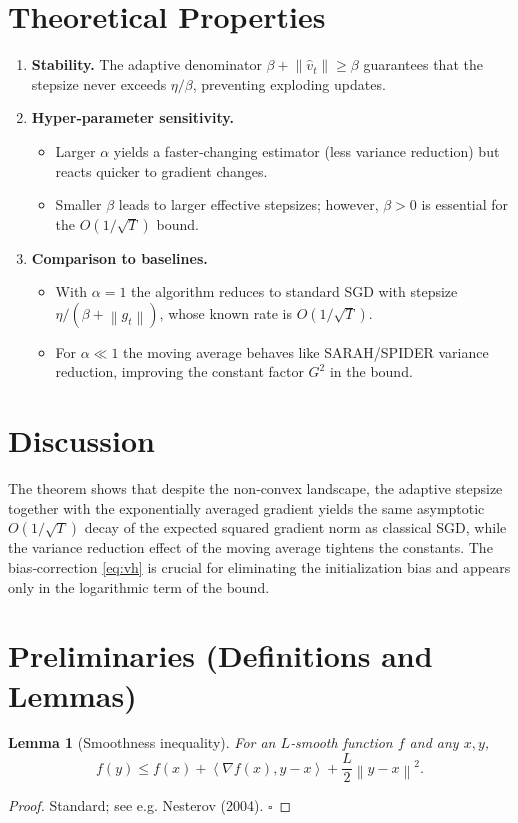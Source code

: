 \documentclass{article}
\newtheorem{lemma}{Lemma}
\newcommand{\norm}[1]{\left\|#1\right\|}
\newcommand{\ip}[2]{\left\langle #1,#2 \right\rangle}
\newcommand{\grad}{\nabla}
\begin{document}
\section*{Theoretical Properties}
\begin{enumerate}[label=\textbf{P\arabic*.}, leftmargin=*]
\item \textbf{Stability.} The adaptive denominator $\beta+\norm{\hat v_t}\ge\beta$ guarantees that the stepsize never exceeds $\eta/\beta$, preventing exploding updates.
\item \textbf{Hyper‑parameter sensitivity.}
    \begin{itemize}
        \item Larger $\alpha$ yields a faster‑changing estimator (less variance reduction) but reacts quicker to gradient changes.
        \item Smaller $\beta$ leads to larger effective stepsizes; however, $\beta>0$ is essential for the $O(1/\sqrt{T})$ bound.
    \end{itemize}
\item \textbf{Comparison to baselines.}
    \begin{itemize}
        \item With $\alpha=1$ the algorithm reduces to standard SGD with stepsize $\eta/(\beta+\norm{g_t})$, whose known rate is $O(1/\sqrt{T})$.
        \item For $\alpha\ll1$ the moving average behaves like SARAH/SPIDER variance reduction, improving the constant factor $G^2$ in the bound.
    \end{itemize}
\end{enumerate}

\section*{Discussion}
The theorem shows that despite the non‑convex landscape, the adaptive
stepsize together with the exponentially averaged gradient yields the same
asymptotic $O(1/\sqrt{T})$ decay of the expected squared gradient norm as
classical SGD, while the variance reduction effect of the moving average
tightens the constants. The bias‑correction \eqref{eq:vh} is crucial for
eliminating the initialization bias and appears only in the logarithmic
term of the bound.

\newpage
\section*{Preliminaries (Definitions and Lemmas)}
\begin{lemma}[Smoothness inequality]
\label{lem:smooth}
For an $L$‑smooth function $f$ and any $x,y$,
\[
f(y)\le f(x)+\ip{\grad f(x)}{y-x}+\frac{L}{2}\norm{y-x}^2 .
\]
\end{lemma}
\begin{proof}
Standard; see e.g. Nesterov (2004). \hfill$\square$
\end{proof}
\end{document}
